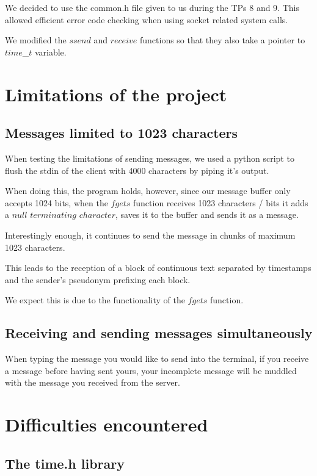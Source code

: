 \documentclass{article}
\begin{document}
We decided to use the common.h file given to us during the TPs 8 and 9. This allowed efficient error code checking when using socket related system calls.\par

We modified the $ssend$ and $receive$ functions so that they also take a pointer to $time$\_$t$ variable. 
\section{Limitations of the project}

\subsection{Messages limited to 1023 characters}
When testing the limitations of sending messages, we used a python script to flush the stdin of the client with 4000 characters by piping it's output. \par 
When doing this, the program holds, however, since our message buffer only accepts 1024 bits, when the $fgets$ function receives 1023 characters / bits it adds a $null$ $terminating$ $character$, saves it to the buffer and sends it as a message. \par
Interestingly enough, it continues to send the message in chunks of maximum 1023 characters. \par
This leads to the reception of a block of continuous text separated by timestamps and the sender's pseudonym prefixing each block. \par
We expect this is due to the functionality of the $fgets$ function.


\subsection{Receiving and sending messages simultaneously}
When typing the message you would like to send into the terminal, if you receive a message before having sent yours, your incomplete message will be muddled with the message you received from the server.

\section{Difficulties encountered}

\subsection{The time.h library}
\end{document}
